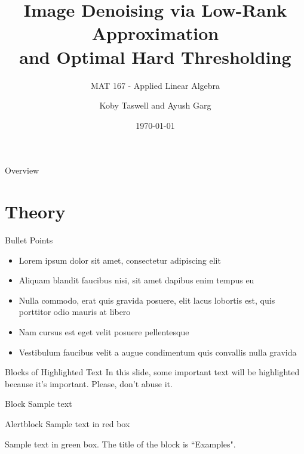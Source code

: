 \documentclass[aspectratio=169,xcolor=dvipsnames]{beamer}
\title[Denoising with SVD]{Image Denoising via Low-Rank Approximation\\ and Optimal Hard Thresholding}
\subtitle{MAT 167 - Applied Linear Algebra}
\author[Taswell and Garg] {Koby Taswell and Ayush Garg}
\institute[UCD] %
{
	University of California, Davis 
	\vskip 3pt
}
\date{\today} %
\begin{document}
	
	\begin{frame}
		\titlepage
	\end{frame}
	
	\begin{frame}{Overview}
		\tableofcontents
	\end{frame}
	
	\section{Theory}
	
	\begin{frame}{Bullet Points}
		\begin{itemize}
			\item Lorem ipsum dolor sit amet, consectetur adipiscing elit
			\item Aliquam blandit faucibus nisi, sit amet dapibus enim tempus eu
			\item Nulla commodo, erat quis gravida posuere, elit lacus lobortis est, quis porttitor odio mauris at libero
			\item Nam cursus est eget velit posuere pellentesque
			\item Vestibulum faucibus velit a augue condimentum quis convallis nulla gravida
		\end{itemize}
	\end{frame}
	
	
	\begin{frame}{Blocks of Highlighted Text}
		In this slide, some important text will be \alert{highlighted} because it's important. Please, don't abuse it.
		
		\begin{block}{Block}
			Sample text
		\end{block}
		
		\begin{alertblock}{Alertblock}
			Sample text in red box
		\end{alertblock}
		
		\begin{examples}
			Sample text in green box. The title of the block is ``Examples".
		\end{examples}
	\end{frame}
	
\end{document}
